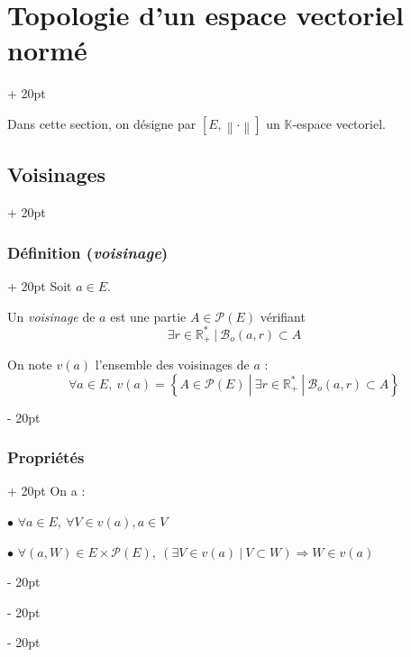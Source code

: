 \documentclass[a4paper, 12pt, twoside]{article}
\newcommand{\R}{\mathbb{R}} %
\newcommand{\K}{\mathbb K}
\newcommand{\lrb}[1]{\left[ #1 \right]}
\newcommand{\set}[1]{\left\{ #1 \right\}}
\newcommand{\norm}[1]{\left\lVert #1 \right\rVert}
\newcommand{\ind}[1][20pt]{\advance\leftskip + #1}
\newcommand{\deind}[1][20pt]{\advance\leftskip - #1}
\newenvironment{indt}[2][20pt]{#2 \par \ind[#1]}{\par \deind} %
\begin{document}
    \vspace{12pt}
    
    \begin{indt}{\section{Topologie d'un espace vectoriel normé}}

        Dans cette section, on désigne par $\lrb{E, \norm \cdot}$ un $\K$-espace vectoriel.

        \begin{indt}{\subsection{Voisinages}}
            \begin{indt}{\subsubsection{Définition (\textit{voisinage})}}
                Soit $a \in E$.

                Un \emph{voisinage} de $a$ est une partie $A \in \mathcal P(E)$ vérifiant
                \[
                    \exists r \in \R^*_+\ |\ \mathscr B_o(a, r) \subset A
                \]

                On note $v(a)$ l'ensemble des voisinages de $a$ :
                \[
                    \forall a \in E,\
                    v(a) = \set{A \in \mathcal P(E)\ |\ \exists r \in \R^*_+\ |\ \mathscr B_o(a, r) \subset A}
                \]
            \end{indt}

            \vspace{12pt}
            
            \begin{indt}{\subsubsection{Propriétés}}
                On a :

                $\bullet$ $
                    \forall a \in E,\
                    \forall V \in v(a), a \in V
                $

                $\bullet$ $
                    \forall (a, W) \in E \times \mathcal P(E),\
                    (\exists V \in v(a)\ |\ V \subset W) \Rightarrow W \in v(a)
                $

                \vspace{6pt}
                

\end{indt}
\end{indt}
\end{indt}
\end{document}
